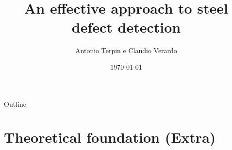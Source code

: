 \documentclass[usenames,dvipsnames,xcolor=table]{beamer}
\title[Steel defect detection]{An effective approach to steel defect detection}
\date[\today]{\today}
\author[Antonio Terpin e Claudio Verardo]{
  Antonio Terpin e Claudio Verardo
}
\institute{Scuola Superiore, University of Udine}
\begin{document}
\begin{frame}
\titlepage
\end{frame}

\begin{frame}{Outline}
\tableofcontents
\end{frame}





\section{Theoretical foundation (Extra)}









\end{document}

